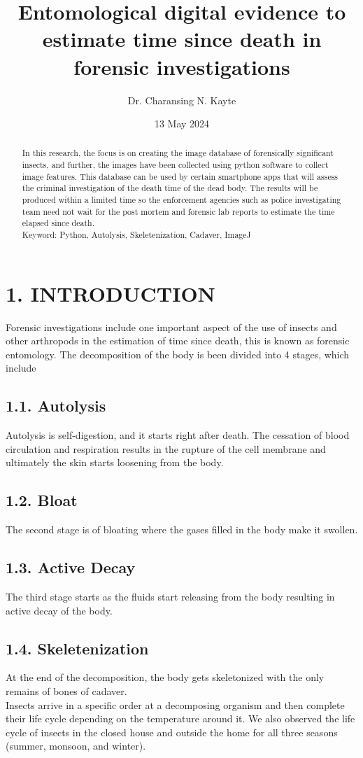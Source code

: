 \documentclass{article}
\title{\textbf{Entomological digital evidence to estimate time since death in forensic investigations}}
\author{Dr. Charansing N. Kayte}
\date{13 May 2024}
\begin{document}
\maketitle

\begin{abstract}
In this research, the focus is on creating the image database of forensically significant insects, and further, the images have been collected using python software to collect image features. This database can be used by certain smartphone apps that will assess the criminal investigation of the death time of the dead body. The results will be produced within a limited time so the enforcement agencies such as police investigating team need not wait for the post mortem and forensic lab reports to estimate the time elapsed since death.\\
Keyword: Python, Autolysis, Skeletenization, Cadaver, ImageJ
\end{abstract}

\section*{1. INTRODUCTION}
Forensic investigations include one important aspect of the use of insects and other arthropods in the estimation of time since death, this is known as forensic entomology. The decomposition of the body is been divided into 4 stages, which include 

\subsection*{1.1. Autolysis}
Autolysis is self-digestion, and it starts right after death. The cessation of blood circulation and respiration results in the rupture of the cell membrane and ultimately the skin starts loosening from the body. 
\subsection*{1.2. Bloat}
The second stage is of bloating where the gases filled in the body make it swollen. 
\subsection*{1.3. Active Decay}
The third stage starts as the fluids start releasing from the body resulting in active decay of the body.
\subsection*{1.4. Skeletenization}
At the end of the decomposition, the body gets skeletonized with the only remains of bones of cadaver.\\
Insects arrive in a specific order at a decomposing organism and then complete their life cycle depending on the temperature around it. We also observed the life cycle of insects in the closed house and outside the home for all three seasons (summer, monsoon, and winter).
\end{document}
